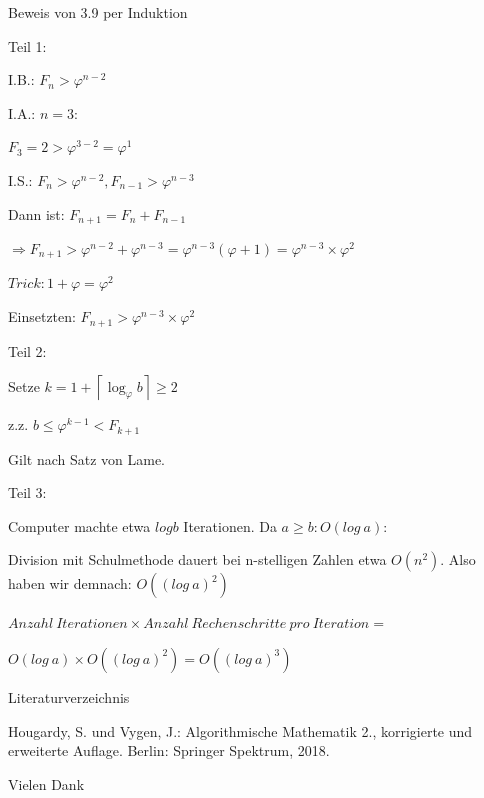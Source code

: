 \documentclass[10pt]{beamer}
\begin{document}
\begin{frame}{Beweis von 3.9 per Induktion}

Teil 1: 

\vspace{0.4cm}
 I.B.: $ F_n > \varphi ^{n-2}$


\vspace{0.3cm}
\indent I.A.: $ n=3: $

$F_3= 2 > \varphi ^ {3-2} = \varphi ^1$


\vspace{=0.3cm}


I.S.: $ F_n > \varphi ^{n-2}, F_{n-1} > \varphi ^ {n-3}$


\vspace{0.15cm}
Dann ist: $ F_{n+1}= F_n + F_ {n-1}$ 

$\Rightarrow F_{n+1} > \varphi ^{n-2} + \varphi ^ {n-3} = \varphi ^ {n-3} ( \varphi +1) = \varphi ^ {n-3} \times \varphi ^2$


\vspace{0.15cm}
 $Trick: 1+ \varphi = \varphi^2 $


 \vspace{0.15cm}
 Einsetzten: $F_{n+1} > \varphi ^{n-3} \times \varphi ^2$

    
\end{frame}


\begin{frame}

    Teil 2: 

\vspace{0.3cm}
 Setze $k= 1 + \left\lceil \log_{\varphi} b \right\rceil \geq 2$ 

 z.z. $b \leq  \varphi ^{k-1} < F_{k+1}$ 
 
\vspace{0.15cm}
 Gilt nach Satz von Lame.

\end{frame}

\begin{frame}

Teil 3: 
 \vspace{0.3cm}

Computer machte etwa $log b$ Iterationen. Da $ a \geq b : O(log \ a) $:

Division mit Schulmethode dauert bei n-stelligen Zahlen etwa $O(n^2)$.
\indent Also haben wir demnach: $O((log \ a)^2)$


\vspace{0.2cm}
$Anzahl \ Iterationen \times Anzahl \ Rechenschritte \ pro \ Iteration=$  

$O(log\ a) \times O((log \ a)^2) = O((log\ a)^3)$


    
\end{frame}

\begin{frame}{Literaturverzeichnis}

Hougardy, S. und  Vygen, J.: Algorithmische Mathematik 2., korrigierte und erweiterte Auflage. Berlin: Springer Spektrum, 2018.

    
\end{frame}


\begin{frame}
\Large  %
\centering
Vielen Dank
    
\end{frame}
\end{document}

